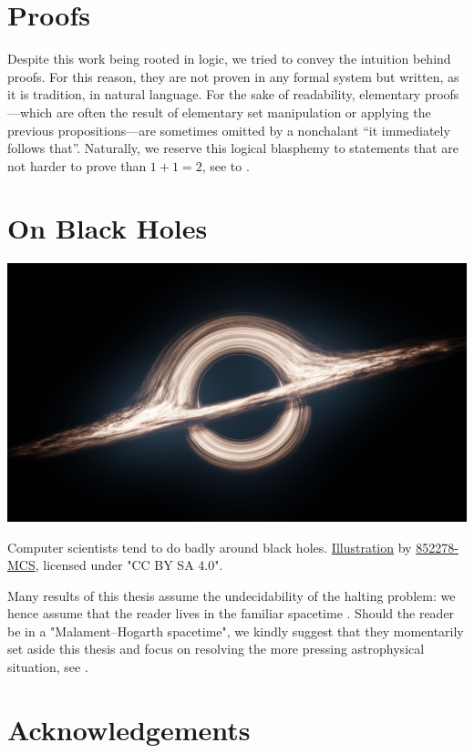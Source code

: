\section*{Proofs}

Despite this work being rooted in logic,
we tried to convey the intuition behind proofs.
For this reason, they are not proven in any formal system but written, as it is
tradition, in natural language. For the sake of readability, elementary
proofs---which are often the result of elementary set manipulation or applying
the previous propositions---are sometimes omitted by a nonchalant
``it immediately follows that''.
Naturally, we reserve this logical blasphemy to
statements that are not harder to prove than $1+1 = 2$,
see \cite[$\ast$ 54.43]{WhiteheadRussell1910PM1} to \cite[$\ast$ 110.643]{WhiteheadRussell1912PM2}.

\section*{On Black Holes}

\begin{marginfigure}
	\centering
	\includegraphics[width=\linewidth]{fig/intro/black-hole.png}
	\caption{
		\AP\label{fig:preface-black-hole}
		Computer scientists tend to do badly around black holes.
		\href{https://commons.wikimedia.org/wiki/File:Black_Hole_Full.png}{Illustration}
		by \href{https://commons.wikimedia.org/wiki/User:852278-MCS}{852278-MCS},
		licensed under "CC BY SA 4.0".
	}
\end{marginfigure}
Many results of this thesis assume the undecidability of the halting problem:
we hence assume that the reader lives in the familiar spacetime \cite{Hogarth1994NonTuring}.
Should the reader be in a "Malament–Hogarth spacetime", we kindly suggest that
they momentarily set aside this thesis and focus on resolving the more pressing
astrophysical situation, see .

\section*{Acknowledgements}

